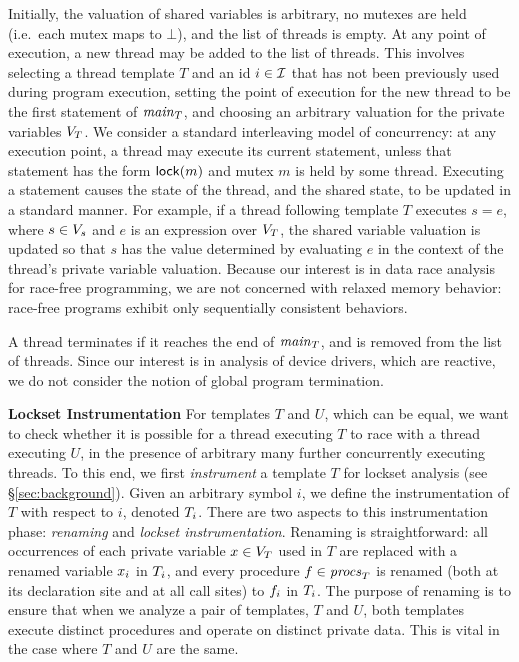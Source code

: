 Initially, the valuation of shared variables is arbitrary, no mutexes are held (i.e.\ each mutex maps to $\bot$), and the list of threads is empty.
%
At any point of execution, a new thread may be added to the list of threads.  This involves selecting a thread template $T$ and an id $i \in \mathcal{I}$ that has not been previously used during program execution, setting the point of execution for the new thread to be the first statement of $\mathit{main}_{T}$, and choosing an arbitrary valuation for the private variables $V_{T}$.
%
We consider a standard interleaving model of concurrency: at any execution point, a thread may execute its current statement, unless that statement has the form $\mathsf{lock}(m)$ and mutex $m$ is held by some thread.  Executing a statement causes the state of the thread, and the shared state, to be updated in a standard manner.  For example, if a thread following template $T$ executes $s = e$, where $s \in V_s$ and $e$ is an expression over $V_{T}$, the shared variable valuation is updated so that $s$ has the value determined by evaluating $e$ in the context of the thread's private variable valuation.  Because our interest is in data race analysis for race-free programming, we are not concerned with relaxed memory behavior: race-free programs exhibit only sequentially consistent behaviors.

A thread terminates if it reaches the end of $\mathit{main}_{T}$, and is removed from the list of threads.  Since our interest is in analysis of device drivers, which are reactive, we do not consider the notion of global program termination.

\noindent\textbf{Lockset Instrumentation }
%
For templates $T$ and $U$, which can be equal, we want to check whether it is possible for a thread executing $T$ to race with a thread executing $U$, in the presence of arbitrary many further concurrently executing threads.
%
To this end, we first \emph{instrument} a template $T$ for lockset analysis (see \S\ref{sec:background}).  Given an arbitrary symbol $i$, we define the instrumentation of $T$ with respect to $i$, denoted $T_{i}$.  There are two aspects to this instrumentation phase: \emph{renaming} and \emph{lockset instrumentation}.
%
Renaming is straightforward: all occurrences of each private variable $x \in V_{T}$ used in $T$ are replaced with a renamed variable $x_{i}$ in $T_{i}$, and every procedure $f \in \mathit{procs}_{T}$ is renamed (both at its declaration site and at all call sites) to $f_{i}$ in $T_{i}$.  The purpose of renaming is to ensure that when we analyze a pair of templates, $T$ and $U$, both templates execute distinct procedures and operate on distinct private data.  This is vital in the case where $T$ and $U$ are the same.

